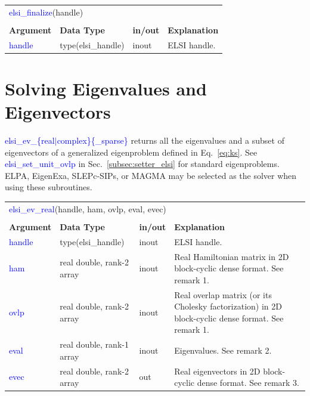 \documentclass{report}
\newcommand{\tcb}[1]{\textcolor{blue}{#1}}
\begin{document}
\begin{tabular}[]{|p{30mm}|p{30mm}|p{15mm}|p{90mm}|}
\multicolumn{4}{l}{\tcb{elsi\_finalize}(handle)}\\
\multicolumn{4}{l}{}\\
\hline
\multicolumn{1}{|l|}{\textbf{Argument}} & \multicolumn{1}{l|}{\textbf{Data Type}} & \multicolumn{1}{l|}{\textbf{in/out}} & \multicolumn{1}{l|}{\textbf{Explanation}}\\
\hline
\tcb{handle} & type(elsi\_handle) & inout & ELSI handle.\\
\hline
\end{tabular}

\section{Solving Eigenvalues and Eigenvectors}
\label{sec:ev}
\tcb{elsi\_ev\_\{real$\vert$complex\}\{\_sparse\}} returns all the eigenvalues and a subset of eigenvectors of a generalized eigenproblem defined in Eq.~\ref{eq:ks}. See \tcb{elsi\_set\_unit\_ovlp} in Sec.~\ref{subsec:setter_elsi} for standard eigenproblems. ELPA, EigenExa, SLEPc-SIPs, or MAGMA may be selected as the solver when using these subroutines.

\begin{tabular}[]{|p{20mm}|p{45mm}|p{15mm}|p{85mm}|}
\multicolumn{4}{l}{\tcb{elsi\_ev\_real}(handle, ham, ovlp, eval, evec)}\\
\multicolumn{4}{l}{}\\
\hline
\multicolumn{1}{|l|}{\textbf{Argument}} & \multicolumn{1}{l|}{\textbf{Data Type}} & \multicolumn{1}{l|}{\textbf{in/out}} & \multicolumn{1}{l|}{\textbf{Explanation}}\\
\hline
\tcb{handle} & type(elsi\_handle)        & inout & ELSI handle.\\
\hline
\tcb{ham}    & real double, rank-2 array & inout & Real Hamiltonian matrix in 2D block-cyclic dense format. See remark 1.\\
\hline
\tcb{ovlp}   & real double, rank-2 array & inout & Real overlap matrix (or its Cholesky factorization) in 2D block-cyclic dense format. See remark 1.\\
\hline
\tcb{eval}   & real double, rank-1 array & inout & Eigenvalues. See remark 2.\\
\hline
\tcb{evec}   & real double, rank-2 array & out   & Real eigenvectors in 2D block-cyclic dense format. See remark 3.\\
\hline
\end{tabular}
\end{document}
